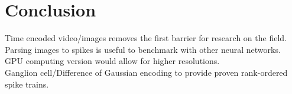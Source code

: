 \documentclass[twocolumn]{article}
\begin{document}
\section{Conclusion}

Time encoded video/images removes the first barrier for research on the field.\\

Parsing images to spikes is useful to benchmark with other neural networks.\\

GPU computing version would allow for higher resolutions.\\

Ganglion cell/Difference of Gaussian encoding to provide proven rank-ordered spike trains.\\

\printbibliography
\end{document}
